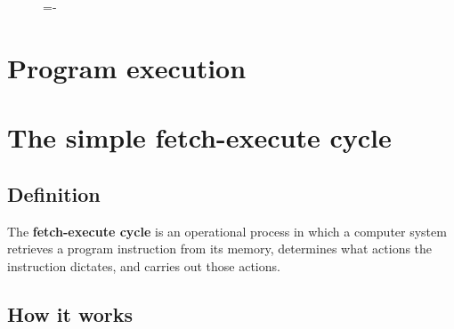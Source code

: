 \documentclass[a4paper]{systems-software}
\begin{document}
\begin{figure}[H]
  \lineskip=-\fboxrule
\end{figure}


\newpage
\section{Program execution}

\section*{The simple fetch-execute cycle}

\subsection*{Definition}

The \textbf{fetch-execute cycle} is an operational process in which a computer system retrieves a program instruction from its memory, determines what actions the instruction dictates, and carries out those actions.


\subsection*{How it works}
\end{document}
